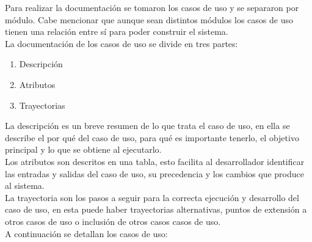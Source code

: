 Para realizar la documentación se tomaron los casos de uso y se separaron por módulo. Cabe mencionar que aunque sean distintos módulos los casos de uso tienen una relación entre sí para poder construir el sistema. \\

La documentación de los casos de uso se divide en tres partes:

\begin{enumerate}
	\item Descripción
	\item Atributos
	\item Trayectorias
\end{enumerate}

La descripción es un breve resumen de lo que trata el caso de uso, en ella se describe el por qué del caso de uso, para qué es importante tenerlo, el objetivo principal y lo que se obtiene al ejecutarlo.\\

Los atributos son descritos en una tabla, esto facilita al desarrollador identificar las entradas y salidas del caso de uso, su precedencia y los cambios que produce al sistema. \\

La trayectoria son los pasos a seguir para la correcta ejecución y desarrollo del caso de uso, en esta puede haber trayectorias alternativas, puntos de extensión a otros casos de uso o inclusión de otros casos casos de uso. \\

A continuación se detallan los casos de uso:


